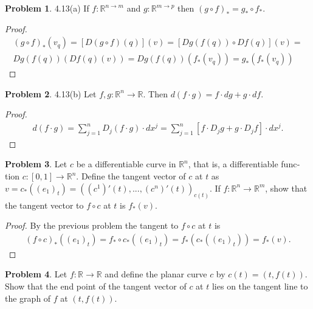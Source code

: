 \documentclass[20pt]{article}
\theoremstyle{plain}
\theoremstyle{definition}
\newtheorem*{problem}{Problem}
\newcommand{\reals}{\mathbb{R}}
\begin{document}
\begin{problem}{4.13(a)}
  If $f: \reals^{n \to m}$ and $g: \reals^{m \to p}$ then $(g \circ f)_* = g_* \circ f_*$.
\end{problem}

\begin{proof}
  \begin{align*}
      (g \circ f)_*(v_q) = 
      [D(g \circ f)(q)](v) = 
      [Dg(f(q))\circ Df(q)](v) = \\
      Dg(f(q))(Df(q)(v)) = 
      Dg(f(q)) (f_*(v_q)) = g_*(f_*(v_q))
  \end{align*}
\end{proof}


\begin{problem}{4.13(b)}
  Let $f, g : \reals^n \to \reals$. Then $d(f\cdot g) = f \cdot dg  + g \cdot df.$
\end{problem}

\begin{proof}
  \begin{align*}
    d(f \cdot g) =
    \sum_{j=1}^n D_j(f \cdot g) \cdot dx^j = 
    \sum_{j=1}^n [f \cdot D_jg + g \cdot  D_jf] \cdot dx^j.
  \end{align*}
\end{proof}



\begin{problem}{4.14}
  Let $c$ be a differentiable curve in $\reals^n$, that is, a differentiable func­tion 
  $c: [0,1] \to \reals^n$. Define the tangent vector of $c$ at $t$ as
  $v = c_*((e_1)_t) = ((c^1)'(t), ..., (c^n)'(t))_{c(t)}$.
  If $f: \reals^n \to \reals^m$, show that the tangent vector to $f \circ c$ at $t$ is $f_*(v)$.
\end{problem}

\begin{proof}
  By the previous problem the tangent to $f \circ c$ at $t$ is 
  \begin{align}
    (f \circ c)_*((e_1)_t) = f_* \circ c_*((e_1)_t) = f_*(c_*((e_1)_t)) = f_*(v).
  \end{align}
\end{proof}



\begin{problem}{4.15}
  Let $f: \reals \to \reals$ and define the planar curve $c$ by $c(t) = (t, f(t))$. 
  Show that the end point of the tangent vector of $c$ at $t$ lies on the 
  tangent line to the graph of $f$ at $(t,f(t))$.
\end{problem}
\end{document}
